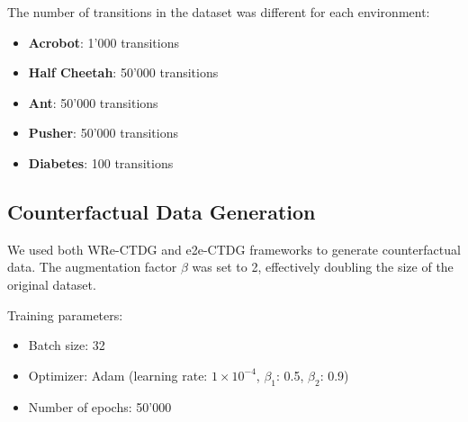 The number of transitions in the dataset was different for each environment:
\begin{itemize}
    \item \textbf{Acrobot}: 1'000 transitions
    \item \textbf{Half Cheetah}: 50'000 transitions
    \item \textbf{Ant}: 50'000 transitions
    \item \textbf{Pusher}: 50'000 transitions
    \item \textbf{Diabetes}: 100 transitions
\end{itemize}

\subsection{Counterfactual Data Generation}

We used both WRe-CTDG and e2e-CTDG frameworks to generate counterfactual data. The augmentation factor $\beta$ was set to 2, effectively doubling the size of the original dataset.

Training parameters:
\begin{itemize}
    \item Batch size: 32
    \item Optimizer: Adam (learning rate: $1\times 10^{-4}$, $\beta_1$: 0.5, $\beta_2$: 0.9)
    \item Number of epochs: 50'000
\end{itemize}

